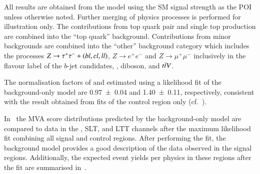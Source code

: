 All results are obtained from the model using the SM \HH signal
strength as the POI unless otherwise noted. Further merging of physics
processes is performed for illustration only. The contributions from
top quark pair and single top production are combined into the ``top
quark'' background. Contributions from minor backgrounds are combined
into the ``other'' background category which includes the processes
$Z \to \tau^{+} \tau^{-} + (bl,cl,ll)$, $Z \to e^{+}e^{-}$ and
$Z \to \mu^{+}\mu^{-}$ inclusively in the flavour label of the $b$-jet
candidates, \Wjets, diboson, and $t\bar{t} V$.

The normalisation factors of \ttbar and \ZHF estimated using a
likelihood fit of the background-only model are \num{0.97 +- 0.04} and
\num{1.40 +- 0.11}, respectively, consistent with the result obtained
from fits of the control region only (cf.\ ).

In~ the MVA score distributions predicted
by the background-only model are compared to data in the \hadhad,
\lephad SLT, and \lephad LTT channels after the maximum likelihood fit
combining all signal and control regions. After performing the fit,
the background model provides a good description of the data observed
in the signal regions. Additionally, the expected event yields per
physics in these regions after the fit are summarised
in~.

